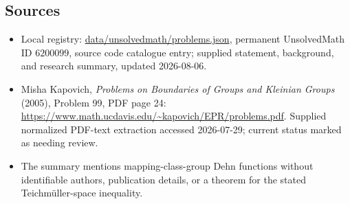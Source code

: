 \documentclass[11pt]{article}
\begin{document}
\subsection{Sources}
\begin{itemize}
\item Local registry: \url{data/unsolvedmath/problems.json}, permanent UnsolvedMath ID \(6200099\), source code catalogue entry; supplied statement, background, and research summary, updated 2026-08-06.
\item Misha Kapovich, \emph{Problems on Boundaries of Groups and Kleinian Groups} (2005), Problem 99, PDF page 24: \url{https://www.math.ucdavis.edu/~kapovich/EPR/problems.pdf}. Supplied normalized PDF-text extraction accessed 2026-07-29; current status marked as needing review.
\item The summary mentions mapping-class-group Dehn functions without identifiable authors, publication details, or a theorem for the stated Teichm\"uller-space inequality.
\end{itemize}
\end{document}
